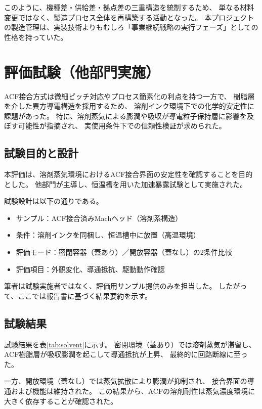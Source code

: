 \documentclass[conference]{IEEEtran}
\begin{document}
このように、機種差・供給差・拠点差の三重構造を統制するため、  
単なる材料変更ではなく、製造プロセス全体を再構築する活動となった。  
本プロジェクトの製造管理は、実装技術よりもむしろ「事業継続戦略の実行フェーズ」としての性格を持っていた。

\section{評価試験（他部門実施）}

ACF接合方式は微細ピッチ対応やプロセス簡素化の利点を持つ一方で、  
樹脂層を介した異方導電構造を採用するため、  
溶剤インク環境下での化学的安定性に課題があった。  
特に、溶剤蒸気による膨潤や吸収が導電粒子保持層に影響を及ぼす可能性が指摘され、  
実使用条件下での信頼性検証が求められた。

\subsection{試験目的と設計}
本評価は、溶剤蒸気環境におけるACF接合界面の安定性を確認することを目的とした。  
他部門が主導し、恒温槽を用いた加速暴露試験として実施された。  

試験設計は以下の通りである。

\begin{itemize}
  \item サンプル：ACF接合済みMachヘッド（溶剤系構造）
  \item 条件：溶剤インクを同梱し、恒温槽中に放置（高温環境）
  \item 評価モード：密閉容器（蓋あり）／開放容器（蓋なし）の2条件比較
  \item 評価項目：外観変化、導通抵抗、駆動動作確認
\end{itemize}

筆者は試験実施者ではなく、評価用サンプル提供のみを担当した。  
したがって、ここでは報告書に基づく結果要約を示す。

\subsection{試験結果}
試験結果を表\ref{tab:solvent}に示す。  
密閉環境（蓋あり）では溶剤蒸気が滞留し、  
ACF樹脂層が吸収膨潤を起こして導通抵抗が上昇、  
最終的に回路断線に至った。  

一方、開放環境（蓋なし）では蒸気拡散により膨潤が抑制され、  
接合界面の導通および機能は維持された。  
この結果から、ACFの溶剤耐性は蒸気濃度環境に大きく依存することが確認された。
\end{document}
